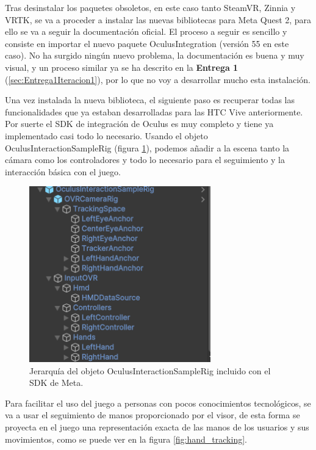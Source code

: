 Tras desinstalar los paquetes obsoletos, en este caso tanto SteamVR, Zinnia y VRTK, se va a proceder a instalar las nuevas bibliotecas para Meta Quest 2, para ello se va a seguir la documentación oficial. \cite{DES_5_1_oculusSDK} El proceso a seguir es sencillo y consiste en importar el nuevo paquete OculusIntegration (versión 55 en este caso). No ha surgido ningún nuevo problema, la documentación es buena y muy visual, y un proceso similar ya se ha descrito en la \textbf{Entrega 1} (\ref{sec:Entrega1Iteracion1}), por lo que no voy a desarrollar mucho esta instalación.

Una vez instalada la nueva biblioteca, el siguiente paso es recuperar todas las funcionalidades que ya estaban desarrolladas para las HTC Vive anteriormente. Por suerte el SDK de integración de Oculus es muy completo y tiene ya implementado casi todo lo necesario. Usando el objeto OculusInteractionSampleRig (figura \ref{fig:sample_rig}), podemos añadir a la escena tanto la cámara como los controladores y todo lo necesario para el seguimiento y la interacción básica con el juego.

\begin{figure}
	\centering
	\includegraphics[width=0.7\textwidth]{04.Desarrollo/05.Entrega5/01.Iteracion5_1/00.Figuras/04.sample_rig.png}
	\caption{Jerarquía del objeto OculusInteractionSampleRig incluido con el SDK de Meta.}
	\label{fig:sample_rig}
\end{figure}


Para facilitar el uso del juego a personas con pocos conocimientos tecnológicos, se va a usar el seguimiento de manos proporcionado por el visor, de esta forma se proyecta en el juego una representación exacta de las manos de los usuarios y sus movimientos, como se puede ver en la figura \ref{fig:hand_tracking}.

